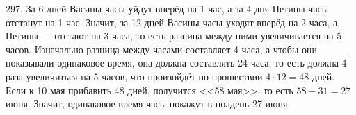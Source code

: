297. За 6 дней Васины часы уйдут вперёд на 1 час, а за 4 дня Петины часы отстанут на 1 час. Значит, за 12 дней Васины часы уходят вперёд на 2 часа, а Петины --- отстают на 3 часа, то есть разница между ними увеличивается на 5 часов. Изначально разница между часами составляет 4 часа, а чтобы они показывали одинаковое время, она должна составлять 24 часа, то есть должна 4 раза увеличиться на 5 часов, что произойдёт по прошествии $4\cdot12=48$ дней. Если к 10 мая прибавить 48 дней, получится <<58 мая>>, то есть $58-31=27$ июня. Значит, одинаковое время часы покажут в полдень 27 июня.\\
